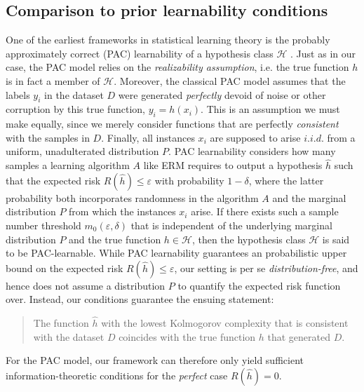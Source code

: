 \subsection{Comparison to prior learnability conditions}
One of the earliest frameworks in statistical learning theory is the probably approximately correct (PAC) learnability of a hypothesis class $\mathcal{H}$ \cite[Chapter 3]{shalev2014understanding}.
Just as in our case, the PAC model relies on the \textit{realizability assumption}, i.e. the true function $h$ is in fact a member of $\mathcal{H}$.
Moreover, the classical PAC model assumes that the labels $y_i$ in the dataset $D$ were generated \textit{perfectly} devoid of noise or other corruption by this true function, $y_i=h(x_i)$.
This is an assumption we must make equally, since we merely consider functions that are perfectly \textit{consistent} with the samples in $D$.
Finally, all instances $x_i$ are supposed to arise $i.i.d.$ from a uniform, unadulterated distribution $P$.
PAC learnability considers how many samples a learning algorithm $A$ like ERM requires to output a hypothesis $\hat{h}$ such that the expected risk $R(\hat{h})\leq \varepsilon$ with probability $1-\delta$, where the latter probability both incorporates randomness in the algorithm $A$ and the marginal distribution $P$ from which the instances $x_i$ arise.
If there exists such a sample number threshold $m_0(\varepsilon,\delta)$ that is independent of the underlying marginal distribution $P$ and the true function $h\in\mathcal{H}$, then the hypothesis class $\mathcal{H}$ is said to be PAC-learnable. 
While PAC learnability guarantees an probabilistic upper bound on the expected risk $R(\hat{h})\leq \varepsilon$, our setting is per se \textit{distribution-free}, and hence does not assume a distribution $P$ to quantify the expected risk function over.
Instead, our conditions guarantee the ensuing statement:
\begin{quote}
	The function $\hat{h}$ with the lowest Kolmogorov complexity that is consistent with the dataset $D$ coincides with the true function $h$ that generated $D$.
\end{quote} 
For the PAC model, our framework can therefore only yield sufficient information-theoretic conditions for the \textit{perfect} case $R(\hat{h})=0$.

